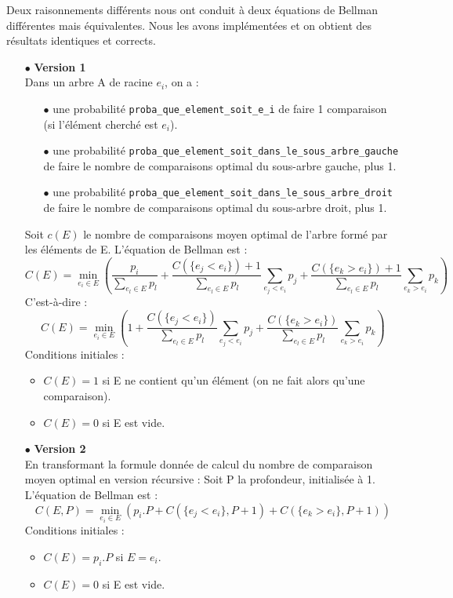 \documentclass[a4paper, 10pt, french]{article}
\begin{document}
Deux raisonnements différents nous ont conduit à deux équations de Bellman différentes mais équivalentes. Nous les avons implémentées et on obtient des résultats identiques et corrects.\\
\begin{itemize}
	\item[$\bullet$] \textbf{Version 1} \\
		Dans un arbre A de racine $e_i$, on a :
		\begin{itemize}
			\item[$\bullet$] une probabilité \verb?proba_que_element_soit_e_i? de faire 1 comparaison (si l'élément cherché est $e_i$).
			\item[$\bullet$] une probabilité \verb?proba_que_element_soit_dans_le_sous_arbre_gauche? de faire le nombre de comparaisons optimal du sous-arbre gauche, plus 1.
			\item[$\bullet$] une probabilité \verb?proba_que_element_soit_dans_le_sous_arbre_droit? de faire le nombre de comparaisons optimal du sous-arbre droit, plus 1.
		\end{itemize}

		Soit $c(E)$ le nombre de comparaisons moyen optimal de l'arbre formé par les éléments de E. L'équation de Bellman est : 
		\[ C(E) = \min_{e_i \in E} ( \frac{p_i}{\sum\limits_{e_l \in E}{p_l}} + \frac{C(\{e_j < e_i\}) + 1}{\sum\limits_{e_l \in E}{p_l}} \sum_{e_j < e_i}{p_j} + \frac{C(\{e_k > e_i\}) + 1}{\sum\limits_{e_l \in E}{p_l}} \sum_{e_k > e_i}{p_k} ) \]
		C'est-à-dire : 
		\[ C(E) = \min_{e_i \in E} ( 1 + \frac{C(\{e_j < e_i\})}{\sum\limits_{e_l \in E}{p_l}} \sum_{e_j < e_i}{p_j} + \frac{C(\{e_k > e_i\})}{\sum\limits_{e_l \in E}{p_l}} \sum_{e_k > e_i}{p_k} ) \]
		Conditions initiales : 
		\begin{itemize}
			\item $C(E) = 1$ si E ne contient qu'un élément (on ne fait alors qu'une comparaison).
			\item $C(E) = 0$ si E est vide. \\
		\end{itemize}

	\item[$\bullet$] \textbf{Version 2} \\
		En transformant la formule donnée de calcul du nombre de comparaison moyen optimal en version récursive : 
		Soit P la profondeur, initialisée à 1.
		L'équation de Bellman est : 
		\[ C(E, P) = \min_{e_i \in E} ( p_i.P + C(\{e_j < e_i\}, P+1) + C(\{e_k > e_i\}, P+1) )\]
		Conditions initiales : 
		\begin{itemize}
			\item $C(E) = p_i.P$ si $E = {e_i}$.
			\item $C(E) = 0$ si E est vide. \\
		\end{itemize}

\end{itemize}
\end{document}
